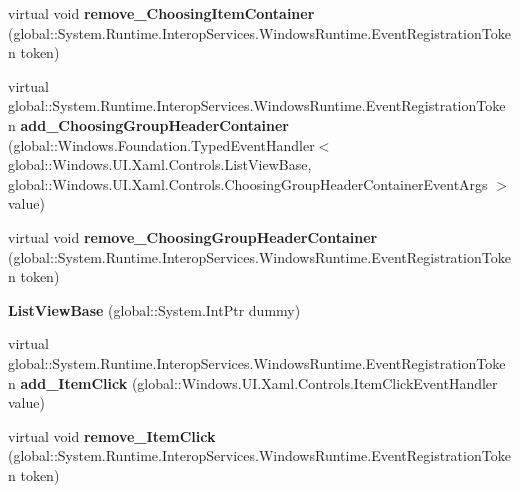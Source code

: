 \begin{DoxyCompactItemize}
virtual void {\bfseries remove\+\_\+\+Choosing\+Item\+Container} (global\+::\+System.\+Runtime.\+Interop\+Services.\+Windows\+Runtime.\+Event\+Registration\+Token token)
\item 
\mbox{\label{class_windows_1_1_u_i_1_1_xaml_1_1_controls_1_1_list_view_base_ab0f949b356d976e285641bfd3da7aaa5}} 
virtual global\+::\+System.\+Runtime.\+Interop\+Services.\+Windows\+Runtime.\+Event\+Registration\+Token {\bfseries add\+\_\+\+Choosing\+Group\+Header\+Container} (global\+::\+Windows.\+Foundation.\+Typed\+Event\+Handler$<$ global\+::\+Windows.\+U\+I.\+Xaml.\+Controls.\+List\+View\+Base, global\+::\+Windows.\+U\+I.\+Xaml.\+Controls.\+Choosing\+Group\+Header\+Container\+Event\+Args $>$ value)
\item 
\mbox{\label{class_windows_1_1_u_i_1_1_xaml_1_1_controls_1_1_list_view_base_a514f2814e24dfe36251dae6870528441}} 
virtual void {\bfseries remove\+\_\+\+Choosing\+Group\+Header\+Container} (global\+::\+System.\+Runtime.\+Interop\+Services.\+Windows\+Runtime.\+Event\+Registration\+Token token)
\item 
\mbox{\label{class_windows_1_1_u_i_1_1_xaml_1_1_controls_1_1_list_view_base_a03e11b8607c3d8428a5603387ff9370f}} 
{\bfseries List\+View\+Base} (global\+::\+System.\+Int\+Ptr dummy)
\item 
\mbox{\label{class_windows_1_1_u_i_1_1_xaml_1_1_controls_1_1_list_view_base_a91aed6f56d2fcd34719f771369fa7d13}} 
virtual global\+::\+System.\+Runtime.\+Interop\+Services.\+Windows\+Runtime.\+Event\+Registration\+Token {\bfseries add\+\_\+\+Item\+Click} (global\+::\+Windows.\+U\+I.\+Xaml.\+Controls.\+Item\+Click\+Event\+Handler value)
\item 
\mbox{\label{class_windows_1_1_u_i_1_1_xaml_1_1_controls_1_1_list_view_base_acc4288ea67ceb5d3c79dab6a268639f8}} 
virtual void {\bfseries remove\+\_\+\+Item\+Click} (global\+::\+System.\+Runtime.\+Interop\+Services.\+Windows\+Runtime.\+Event\+Registration\+Token token)
\item 
\mbox{\label{class_windows_1_1_u_i_1_1_xaml_1_1_controls_1_1_list_view_base_a85a658cab21ea353f8b12e255c61ffd0}} 

\end{DoxyCompactItemize}
